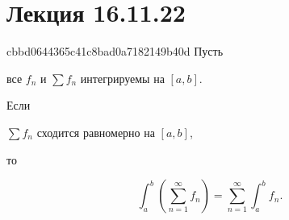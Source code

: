 \section{Лекция 16.11.22}
\begin{note}{cbbd0644365c41c8bad0a7182149b40d}
    Пусть \begin{icloze}{3}все \({ f_n }\) и \({ \sum f_n }\) интегрируемы на \({ [a, b] }\).\end{icloze}
    Если \begin{icloze}{2}\({ \sum f_n }\) сходится равномерно на \({ [a, b] }\),\end{icloze} то
    \begin{icloze}{1}
        \[
            \int_{a}^{b} \left( \sum_{n=1}^{\infty} f_n \right) = \sum_{n=1}^{\infty} \int_{a}^{b} f_n.
        \]
    \end{icloze}
\end{note}


